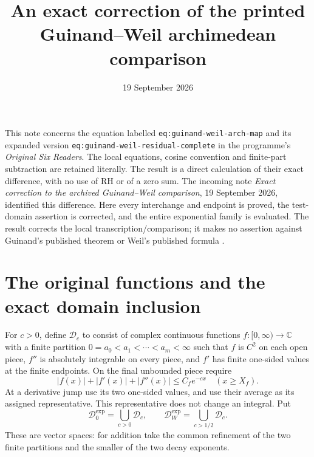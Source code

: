 \documentclass[11pt]{article}
\title{An exact correction of the printed Guinand--Weil archimedean comparison}
\author{}
\date{19 September 2026}
\newcommand{\C}{\mathbb C}
\begin{document}
\maketitle

This note concerns the equation labelled
\texttt{eq:guinand-weil-arch-map} and its expanded version
\texttt{eq:guinand-weil-residual-complete} in the programme's
\emph{Original Six Readers}.  The local equations, cosine convention and
finite-part subtraction are retained literally.  The result is a direct
calculation of their exact difference, with no use of RH or of a zero sum.
The incoming note \emph{Exact correction to the archived Guinand--Weil
comparison}, 19 September 2026, identified this difference.  Here every
interchange and endpoint is proved, the test-domain assertion is corrected,
and the entire exponential family is evaluated.  The result corrects the
local transcription/comparison; it makes no assertion against Guinand's
published theorem \cite{guinand1948} or Weil's published formula
\cite{weil1952}.

\section{The original functions and the exact domain inclusion}

For $c>0$, define $\mathcal D_c$ to consist of complex continuous functions
$f:[0,\infty)\to\C$ with a finite partition
$0=a_0<a_1<\cdots<a_m<\infty$ such that $f$ is $C^2$ on each open piece,
$f''$ is absolutely integrable on every piece, and $f'$ has finite
one-sided values at the finite endpoints.  On the final unbounded piece
require
\begin{equation}
 |f(x)|+|f'(x)|+|f''(x)|\le C_f e^{-cx}
 \quad (x\ge X_f).
 \label{gc:decay}
\end{equation}
At a derivative jump use its two one-sided values, and use their average
as its assigned representative.  This representative does not change an
integral.  Put
\begin{equation}
 \mathcal D_0^{\exp}=\bigcup_{c>0}\mathcal D_c,
 \qquad \mathcal D_W^{\exp}=\bigcup_{c>1/2}\mathcal D_c.
 \label{gc:domains}
\end{equation}
These are vector spaces: for addition take the common refinement of the
two finite partitions and the smaller of the two decay exponents.
\end{document}
